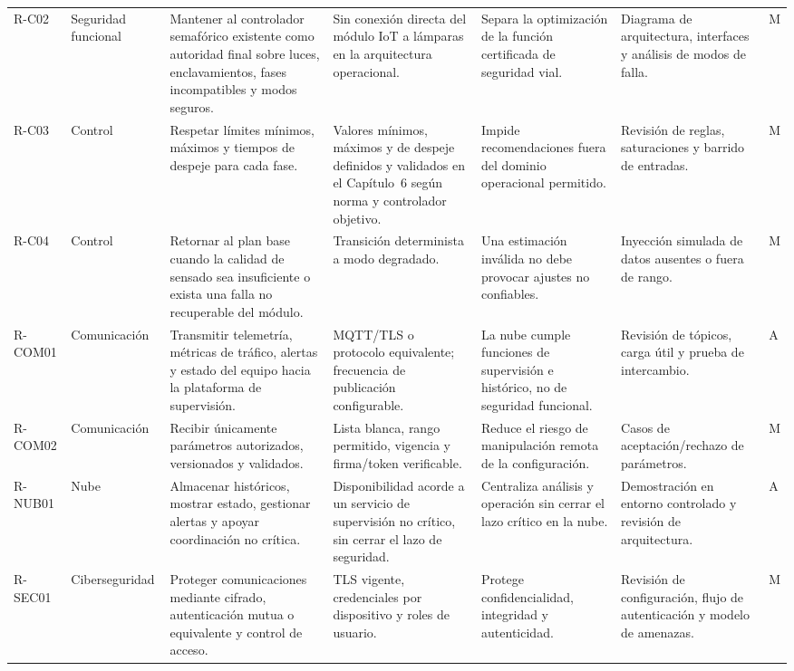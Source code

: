 \begin{landscape}
\begin{longtable}{@{}p{1.15cm}p{1.7cm}p{5.1cm}p{3.1cm}p{4.2cm}p{3.6cm}p{1.0cm}@{}}
R-C02 & Seguridad funcional & Mantener al controlador semafórico existente como autoridad final sobre luces, enclavamientos, fases incompatibles y modos seguros. & Sin conexión directa del módulo IoT a lámparas en la arquitectura operacional. & Separa la optimización de la función certificada de seguridad vial. & Diagrama de arquitectura, interfaces y análisis de modos de falla. & M\\
R-C03 & Control & Respetar límites mínimos, máximos y tiempos de despeje para cada fase. & Valores mínimos, máximos y de despeje definidos y validados en el Capítulo~6 según norma y controlador objetivo. & Impide recomendaciones fuera del dominio operacional permitido. & Revisión de reglas, saturaciones y barrido de entradas. & M\\
R-C04 & Control & Retornar al plan base cuando la calidad de sensado sea insuficiente o exista una falla no recuperable del módulo. & Transición determinista a modo degradado. & Una estimación inválida no debe provocar ajustes no confiables. & Inyección simulada de datos ausentes o fuera de rango. & M\\
R-COM01 & Comunicación & Transmitir telemetría, métricas de tráfico, alertas y estado del equipo hacia la plataforma de supervisión. & MQTT/TLS o protocolo equivalente; frecuencia de publicación configurable. & La nube cumple funciones de supervisión e histórico, no de seguridad funcional. & Revisión de tópicos, carga útil y prueba de intercambio. & A\\
R-COM02 & Comunicación & Recibir únicamente parámetros autorizados, versionados y validados. & Lista blanca, rango permitido, vigencia y firma/token verificable. & Reduce el riesgo de manipulación remota de la configuración. & Casos de aceptación/rechazo de parámetros. & M\\
R-NUB01 & Nube & Almacenar históricos, mostrar estado, gestionar alertas y apoyar coordinación no crítica. & Disponibilidad acorde a un servicio de supervisión no crítico, sin cerrar el lazo de seguridad. & Centraliza análisis y operación sin cerrar el lazo crítico en la nube. & Demostración en entorno controlado y revisión de arquitectura. & A\\
R-SEC01 & Ciberseguridad & Proteger comunicaciones mediante cifrado, autenticación mutua o equivalente y control de acceso. & TLS vigente, credenciales por dispositivo y roles de usuario. & Protege confidencialidad, integridad y autenticidad. & Revisión de configuración, flujo de autenticación y modelo de amenazas. & M\\

\end{longtable}
\end{landscape}
